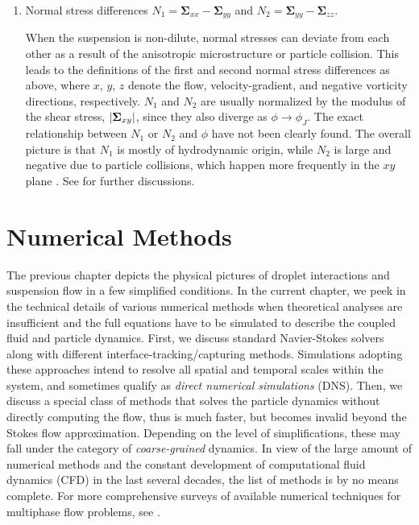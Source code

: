 \begin{enumerate}
\item Normal stress differences $N_1=\bm{\Sigma}_{xx}-\bm{\Sigma}_{yy}$ and $N_2=\bm{\Sigma}_{yy}-\bm{\Sigma}_{zz}$.

\medskip
When the suspension is non-dilute, normal stresses can deviate from each other as a result of the anisotropic microstructure or particle collision.
This leads to the definitions of the first and second normal stress differences as above, where $x$, $y$, $z$ denote the flow, velocity-gradient, and negative vorticity directions, respectively.
$N_1$ and $N_2$ are usually normalized by the modulus of the shear stress, $\lvert\bm{\Sigma}_{xy}\rvert$, since they also diverge as $\phi \to \phi_J$.
The exact relationship between $N_1$ or $N_2$ and $\phi$ have not been clearly found. The overall picture is that $N_1$ is mostly of hydrodynamic origin, while $N_2$ is large and negative due to particle collisions, which happen more frequently in the $xy$ plane \citep{guazzelli_pouliquen_2018}.
See \cite{seto_giusteri_2018} for further discussions.

\end{enumerate}



\chapter{Numerical Methods}


The previous chapter depicts the physical pictures of droplet interactions and suspension flow in a few simplified conditions.
In the current chapter, we peek in the technical details of various numerical methods when theoretical analyses are insufficient and the full equations have to be simulated to describe the coupled fluid and particle dynamics.
First, we discuss standard Navier-Stokes solvers along with different interface-tracking/capturing methods. Simulations adopting these approaches intend to resolve all spatial and temporal scales within the system, and sometimes qualify as \emph{direct numerical simulations} (DNS).
Then, we discuss a special class of methods that solves the particle dynamics without directly computing the flow, thus is much faster, but becomes invalid beyond the Stokes flow approximation. Depending on the level of simplifications, these may fall under the category of \emph{coarse-grained} dynamics.
In view of the large amount of numerical methods and the constant development of computational fluid dynamics (CFD) in the last several decades, the list of methods is by no means complete. For more comprehensive surveys of available numerical techniques for multiphase flow problems, see \cite{prosperetti_tryggvason_2007, Rosti2019}.


